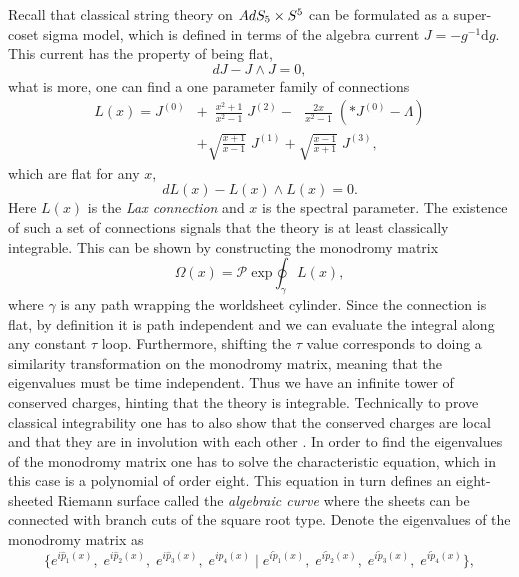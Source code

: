 Recall that classical string theory on $AdS_5 \times S^5$ can be formulated as a super-coset sigma model, which is defined in terms of the algebra current $J = -g^{-1} \mathrm{d} g$. 
This current has the property of being flat,
\begin{equation}
	dJ - J \wedge J = 0,
\end{equation}
what is more, one can find a one parameter family of connections \cite{Bena:2003wd}
\begin{equation}
\begin{split}
	L(x) = J^{(0)} & + \,\,\, \frac{x^2 + 1}{x^2 - 1} \; J^{(2)}  - \,\,\,\, \frac{2x}{x^2 - 1} \; \left( * J^{(0)} - \Lambda \right) \\ 
	 & + \sqrt{\frac{x+1}{x-1}} \; J^{(1)} + \sqrt{\frac{x-1}{x+1}} \; J^{(3)},
\end{split}
\end{equation} 
which are flat for any $x$,
\begin{equation}
	dL(x) - L(x) \wedge L(x) = 0.
\end{equation}
Here $L(x)$ is the \emph{Lax connection} and $x$ is the spectral parameter. 
The existence of such a set of connections signals that the theory is at least classically integrable. 
This can be shown by constructing the monodromy matrix
\begin{equation}
	\label{eq:monodromy}
	\Omega(x) = \mathcal{P} \; \mathrm{exp} \oint_\gamma L(x),
\end{equation}
where $\gamma$ is any path wrapping the worldsheet cylinder. 
Since the connection is flat, by definition it is path independent and we can evaluate the integral along any constant $\tau$ loop. 
Furthermore, shifting the $\tau$ value corresponds to doing a similarity transformation on the monodromy matrix, meaning that the eigenvalues must be time independent. 
Thus we have an infinite tower of conserved charges, hinting that the theory is integrable. 
Technically to prove classical integrability one has to also show that the conserved charges are local and that they are in involution with each other \cite{Das:2004hy,Berkovits:2004jw}.
In order to find the eigenvalues of the monodromy matrix one has to solve the characteristic equation, which in this case is a polynomial of order eight.
This equation in turn defines an eight-sheeted Riemann surface called the \emph{algebraic curve} where the sheets can be connected with branch cuts of the square root type. 
Denote the eigenvalues of the monodromy matrix as
\begin{equation}
	\{ e^{i\hat{p}_1(x)}, \; e^{i\hat{p}_2(x)}, \; e^{i\hat{p}_3(x)}, \; e^{i\hat{p}_4(x)} \; | \; e^{i\tilde{p}_1(x)}, \; e^{i\tilde{p}_2(x)}, \; e^{i\tilde{p}_3(x)}, \; e^{i\tilde{p}_4(x)} \},
\end{equation} 
